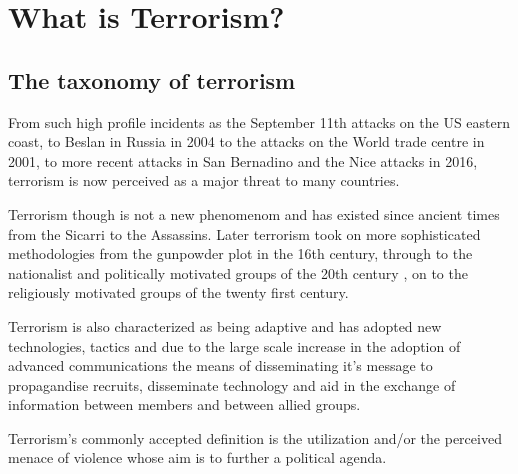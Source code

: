 
\chapter{What is Terrorism?}

\section{The taxonomy of terrorism}

From such high profile incidents as the September 11th attacks on the US eastern coast, to Beslan in Russia in 2004 to the attacks on the World trade centre in 2001, to more recent attacks in San Bernadino and the Nice attacks in 2016, terrorism is now perceived as a major threat to many countries.

Terrorism though is not a new phenomenom and has existed since ancient times from the Sicarri to the Assassins. Later terrorism took on more sophisticated methodologies from the gunpowder plot in the 16th century, through to the nationalist and politically motivated groups of the 20th century , on to the religiously motivated groups of the twenty first century.

Terrorism is also characterized as being adaptive and has adopted new technologies, tactics and due to the large scale increase in the adoption of advanced communications the means of disseminating it's message to propagandise  recruits, disseminate technology and aid in the exchange of information between members and between allied groups.

Terrorism's commonly accepted definition is the utilization and/or the perceived menace of violence whose aim is to further a political agenda.

